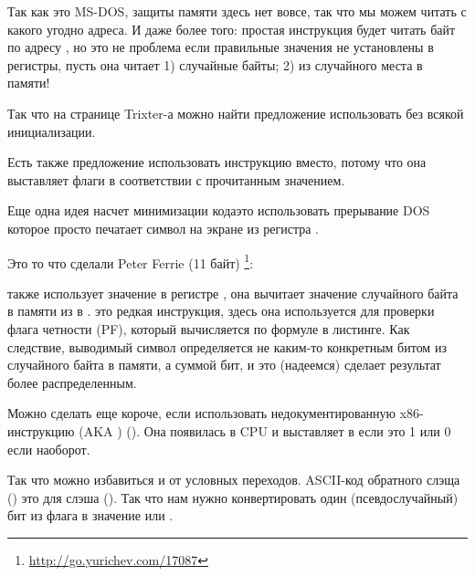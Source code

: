 


Так как это MS-DOS, защиты памяти здесь нет вовсе, так что мы можем читать с какого
угодно адреса.
И даже более того: простая инструкция  
будет читать байт по адресу , но это не проблема
если правильные значения не установлены в регистры, пусть она читает 1) случайные байты; 2) из случайного
места в памяти!

Так что на странице Trixter-а\FNURLTRIXTER 
можно найти предложение использовать  без всякой инициализации.

Есть также предложение использовать инструкцию  
вместо, потому что она выставляет флаги в соответствии с прочитанным значением.

Еще одна идея насчет минимизации кода\EMDASH{}это использовать прерывание DOS
  которое просто печатает символ на экране
из регистра .

Это то что сделали Peter Ferrie \AndENRU \HERMIT{} (11  байт)
\footnote{\url{http://go.yurichev.com/17087}}:



 также использует значение в регистре , она вычитает значение
случайного байта в памяти из
  в .
 это редкая инструкция, здесь она используется для проверки флага четности (PF),
который вычисляется по формуле в листинге.
Как следствие, выводимый символ определяется не каким-то конкретным битом из случайного байта в памяти,
а суммой бит, и это (надеемся) сделает результат более распределенным.

Можно сделать еще короче, если использовать недокументированную x86-инструкцию  (\ac{AKA} ) ().
Она появилась в \ac{CPU} и выставляет  в 
 если  это 1 или 0 если наоборот.



Так что можно избавиться и от условных переходов.
\ac{ASCII}-код обратного слэща (\q{\textbackslash{}}) 
это  \AndENRU {} для слэша (\q{/}).
%
Так что нам нужно конвертировать один (псевдослучайный) бит из флага  в значение  или .

